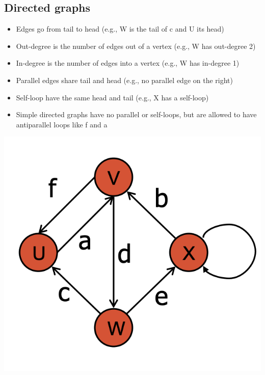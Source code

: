 \documentclass[12pt]{article}
\newcommand{\1}{\space \quad}
\newcommand{\2}{\quad \quad \quad}
\newcommand{\3}{\quad \quad \quad \quad \space}
\newcommand{\4}{\quad \quad \quad \quad \quad \quad}
\newcommand{\5}{\quad \quad \quad \quad \quad \quad \quad \space}
\begin{document}
\subsection{Directed graphs}
\begin{minipage}[l]{0.6\textwidth}
  \begin{itemize}
    \item Edges go from tail to head (e.g., W is the tail of c and U its head)
    \item Out-degree is the number of edges out of a vertex (e.g., W has out-degree 2)
    \item In-degree is the number of edges into a vertex (e.g., W has in-degree 1)
    \item Parallel edges share tail and head (e.g., no parallel edge on the right)
    \item Self-loop have the same head and tail (e.g., X has a self-loop)
    \item Simple directed graphs have no parallel or self-loops, but are allowed to have antiparallel loops like f and a
  \end{itemize}
\end{minipage}
\begin{minipage}[r]{0.39\textwidth}
  \raggedleft
  \includegraphics[width=\textwidth]{image17.png}
\end{minipage}
\end{document}
